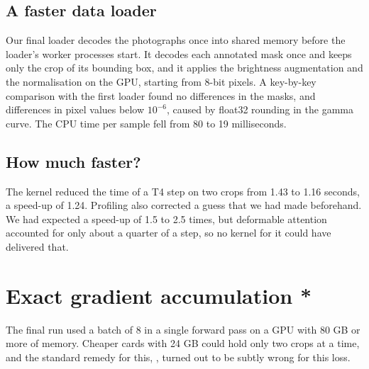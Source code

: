 \subsection{A faster data loader}\label{sec:train-loader}
Our final loader decodes the photographs once into shared memory before the loader's worker processes
start. It decodes each annotated mask once and keeps only the crop of its bounding box, and it applies
the brightness augmentation and the normalisation on the GPU, starting from 8-bit pixels. A key-by-key
comparison with the first loader found no differences in the masks, and differences in pixel values
below $10^{-6}$, caused by float32 rounding in the gamma curve. The CPU time per sample fell from 80 to
19 milliseconds.

\subsection{How much faster?}\label{sec:train-speed}
The kernel reduced the time of a T4 step on two crops from 1.43 to 1.16 seconds, a speed-up of 1.24.
Profiling also corrected a guess that we had made beforehand. We had expected a speed-up of 1.5 to 2.5
times, but deformable attention accounted for only about a quarter of a step, so no kernel for it could
have delivered that.

\section{Exact gradient accumulation *}\label{sec:train-accumulation}
The final run used a batch of 8 in a single forward pass on a GPU with 80 GB or more of memory.
Cheaper cards with 24 GB could hold only two crops at a time, and the standard remedy for this,
, turned out to be subtly wrong for this loss.

